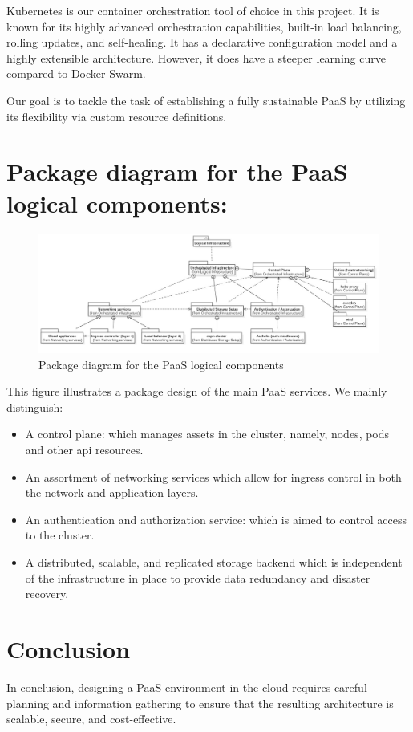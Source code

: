 Kubernetes is our container orchestration tool of choice in this project. It is known for its highly advanced orchestration capabilities, built-in load balancing, rolling updates, and self-healing. It has a declarative configuration model and a highly extensible architecture. However, it does have a steeper learning curve compared to Docker Swarm.  

Our goal is to tackle the task of establishing a fully sustainable PaaS by utilizing its flexibility via custom resource definitions. 


\section{Package diagram for the PaaS logical components:}

\begin{figure}[H]\centering
\includegraphics[width=1.0\textwidth,angle=00]{assets/f12.jpg}
\caption{Package diagram for the PaaS logical components}
\label{fig:Package diagram for the PaaS logical components}
\end{figure}

This figure illustrates a package design of the main PaaS services. We mainly distinguish: 
\begin{itemize}[label={--}]
\item  A control plane: which manages assets in the cluster, namely, nodes, pods and other api resources. 
\item An assortment of networking services which allow for ingress control in both the network and application layers. 
\item An authentication and authorization service: which is aimed to control access to the cluster. 
\item A distributed, scalable, and replicated storage backend which is independent of the infrastructure in place to provide data redundancy and disaster recovery. 
\end{itemize}

\section*{Conclusion}
In conclusion, designing a PaaS environment in the cloud requires careful planning and information gathering to ensure that the resulting architecture is scalable, secure, and cost-effective. 

